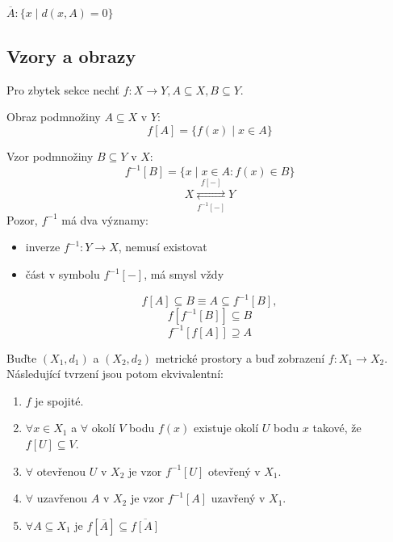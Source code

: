 \documentclass[../main.tex]{subfiles}
\begin{document}
\begin{definition}[Uzávěr]
	$\overline{A} : \{x \mid d(x,A) = 0\}$
\end{definition}

\subsection{Vzory a obrazy}
Pro zbytek sekce nechť $f: X \rightarrow Y, A \subseteq X, B \subseteq Y$.

\begin{definition}[Obraz]
	Obraz podmnožiny $A\subseteq X$ v $Y$:
	\[f[A] = \{f(x) \mid x \in A\}\]
\end{definition}

\begin{definition}[Vzor]
	Vzor podmnožiny $B\subseteq Y$ v $X$:
	\[f^{-1}[B] = \{x \mid x \in A: f(x) \in B\}\]
	\[X \underset{f^{-1}[-]}{\stackrel{f[-]}{\rightleftarrows}} Y\]
	Pozor, $f^{-1}$ má dva významy:
	\begin{itemize}
		\item inverze $f^{-1}:Y \rightarrow X$, nemusí existovat
		\item část v symbolu $f^{-1}[-]$, má smysl vždy
	\end{itemize}
\end{definition}

\begin{lemma}
	\[f[A] \subseteq B \equiv A \subseteq f^{-1}[B],\]
	\[f[f^{-1}[B]] \subseteq B\]
	\[f^{-1}[f[A]] \supseteq A\]
\end{lemma}

\begin{theorem}
	Buďte $(X_1, d_1)$ a $(X_2, d_2)$ metrické prostory a buď zobrazení $f: X_1 \to X_2$. Následující tvrzení
	jsou potom ekvivalentní:
	\begin{enumerate}
	    \item $f$ je spojité.
	    \item $\forall x \in X_1$ a $\forall$ okolí $V$ bodu $f(x)$ existuje okolí $U$ bodu $x$ takové, že
	        $f[U] \subseteq V$.
	    \item $\forall$ otevřenou $U$ v $X_2$ je vzor $f^{-1}[U]$ otevřený v $X_1$.
	    \item $\forall$ uzavřenou $A$ v $X_2$ je vzor $f^{-1}[A]$ uzavřený v $X_1$.
	    \item $\forall A \subseteq X_1$ je $f[\overline{A}] \subseteq \overline{f[A]}$
	\end{enumerate}
\end{theorem}
\end{document}
